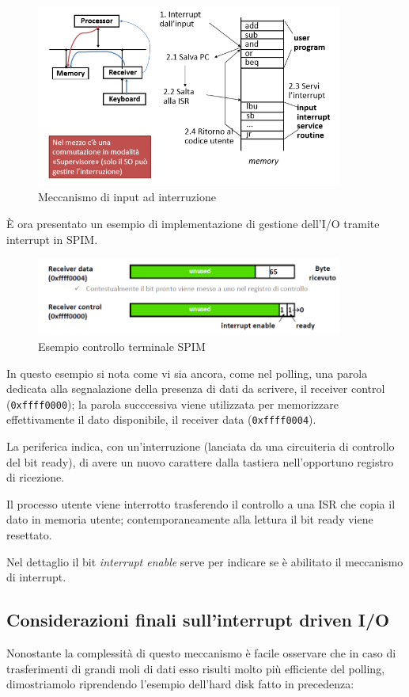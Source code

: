\documentclass[class=book, crop=false, oneside]{standalone}
\begin{document}
\begin{figure}[H]
	\centering
	\includegraphics[width=0.9\textwidth,keepaspectratio]{input-a-interruzione}
	\caption{Meccanismo di input ad interruzione}
\end{figure}
È ora presentato un esempio di implementazione di gestione dell'I/O tramite interrupt in SPIM.
\begin{figure}[H]
	\centering
	\includegraphics[width=0.9\textwidth,keepaspectratio]{SPIM2}
	\caption{Esempio controllo terminale SPIM}
\end{figure}
In questo esempio si nota come vi sia ancora, come nel polling, una parola dedicata alla segnalazione della presenza di dati da scrivere, il receiver control (\texttt{0xffff0000}); la parola succcessiva viene utilizzata per memorizzare effettivamente il dato disponibile, il receiver data (\texttt{0xffff0004}).

La periferica indica, con un'interruzione (lanciata da una circuiteria di controllo del bit ready), di avere un nuovo carattere dalla tastiera nell'opportuno registro di ricezione.

Il processo utente viene interrotto trasferendo il controllo a una ISR che copia il dato in memoria utente; contemporaneamente alla lettura il bit ready viene resettato.

Nel dettaglio il bit \emph{interrupt enable} serve per indicare se è abilitato il meccanismo di interrupt.

\subsection{Considerazioni finali sull'interrupt driven I/O}
Nonostante la complessità di questo meccanismo è facile osservare che in caso di trasferimenti di grandi moli di dati esso risulti  molto più efficiente del polling, dimostriamolo riprendendo l'esempio dell'hard disk fatto in precedenza:
\end{document}
